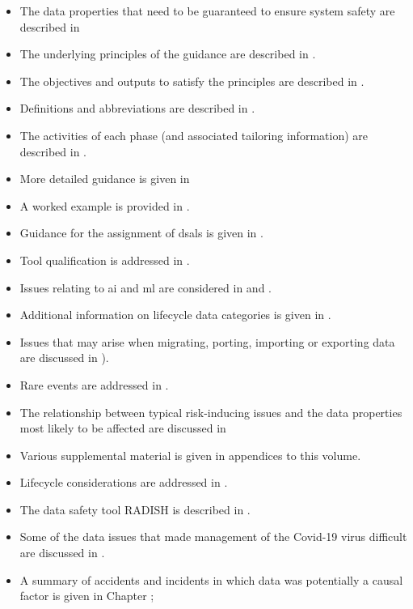 \begin{itemize}
	\item The data properties that need to be guaranteed to ensure system safety are described in 
	\item The underlying principles of the guidance are described in .
	\item The objectives and outputs to satisfy the principles are described in .
	\item Definitions and abbreviations are described in .
	\item The activities of each phase (and associated \gls{tailoring} \gls{information}) are described in .
	\item More detailed guidance is given in 
	\item A worked example is provided in .
	\item Guidance for the assignment of \glspl{dsal} is given in .
	\item Tool qualification is addressed in .
	\item Issues relating to \gls{ai} and \gls{ml} are considered in  and .
	\item Additional information on lifecycle data categories is given in .
	\item Issues that may arise when migrating, porting, importing or exporting data are discussed in ).
	\item Rare events are addressed in .
	\item The relationship between typical risk-inducing issues and the data properties most likely to be affected are discussed in 
	\item Various supplemental material is given in appendices to this volume.
	
	\item Lifecycle considerations are addressed in .
	\item The data safety tool RADISH is described in .
	\item Some of the data issues that made management of the Covid-19 virus difficult are discussed in .
	\item A summary of accidents and incidents in which data was potentially a causal factor is given in Chapter ;
\end{itemize}

